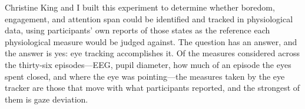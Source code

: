 %
%

Christine King and I built this experiment to determine whether boredom, engagement, and
attention span could be identified and tracked in physiological data, using participants' own
reports of those states as the reference each physiological measure would be judged against.
The question has an answer, and the answer is yes: eye tracking accomplishes it. Of the measures considered across the
thirty-six episodes---EEG, pupil diameter, how much of an episode the eyes spent closed, and
where the eye was pointing---the measures taken by the eye tracker are those that move with what
participants reported, and the strongest of them is gaze deviation.

